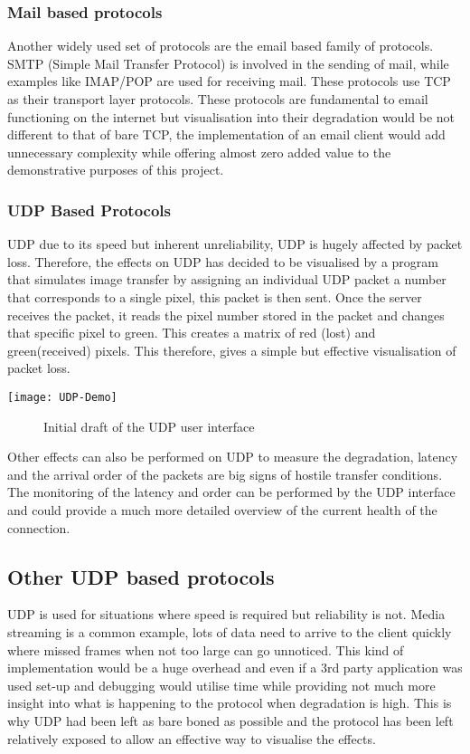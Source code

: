 \subsubsection*{Mail based protocols}
Another widely used set of protocols are the email based family of protocols. SMTP (Simple Mail Transfer Protocol) is involved in the sending of mail, while examples like IMAP/POP are used for receiving mail. These protocols use TCP as their transport layer protocols. These protocols are fundamental to email functioning on the internet but visualisation into their degradation would be not different to that of bare TCP, the implementation of an email client would add unnecessary complexity while offering almost zero added value to the demonstrative purposes of this project.

\subsubsection{UDP Based Protocols}
UDP due to its speed but inherent unreliability, UDP is hugely affected by packet loss. Therefore, the effects on UDP has decided to be visualised by a program that simulates image transfer by assigning an individual UDP packet a number that corresponds to a single pixel, this packet is then sent. Once the server receives the packet, it reads the pixel number stored in the packet and changes that specific pixel to green. This creates a matrix of red (lost) and green(received) pixels. This therefore, gives a simple but effective visualisation of packet loss. 

\begin{center}
\texttt{[image: UDP-Demo]}
	\begin{figure}[h]
		\caption{Initial draft of the UDP user interface}
	\end{figure}
\end{center}

Other effects can also be performed on UDP to measure the degradation, latency and the arrival order of the packets are big signs of hostile transfer conditions. The monitoring of the latency and order can be performed by the UDP interface and could provide a much more detailed overview of the current health of the connection.

\subsection*{Other UDP based protocols}
UDP is used for situations where speed is required but reliability is not. Media streaming is a common example, lots of data need to arrive to the client quickly where missed frames when not too large can go unnoticed. This kind of implementation would be a huge overhead and even if a 3rd party application was used set-up and debugging would utilise time while providing not much more insight into what is happening to the protocol when degradation is high. This is why UDP had been left as bare boned as possible and the protocol has been left relatively exposed to allow an effective way to visualise the effects.

